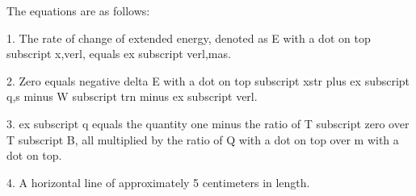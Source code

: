The equations are as follows:

1. The rate of change of extended energy, denoted as E with a dot on top subscript x,verl, equals ex subscript verl,mas.

2. Zero equals negative delta E with a dot on top subscript xstr plus ex subscript q,s minus W subscript trn minus ex subscript verl.

3. ex subscript q equals the quantity one minus the ratio of T subscript zero over T subscript B, all multiplied by the ratio of Q with a dot on top over m with a dot on top.

4. A horizontal line of approximately 5 centimeters in length.